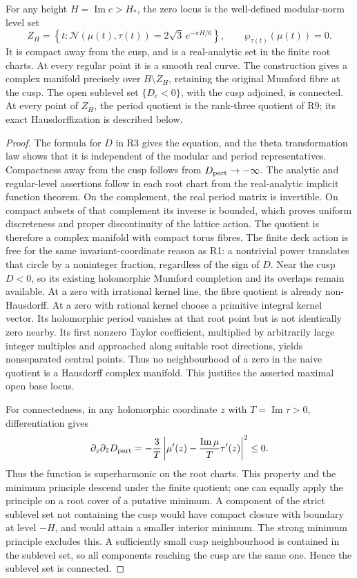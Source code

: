 \begin{proposition}[D.4.2; Proved]
For any height \(H=\operatorname{Im}c>H_*\), the zero locus is the
well-defined modular-norm level set
\[
 Z_H=\left\{t:\mathcal N(\mu(t),\tau(t))
                    =2\sqrt3\,e^{-\pi H/6}\right\},\qquad
 \wp_{\tau(t)}(\mu(t))=0.
\]
It is compact away from the cusp, and is a real-analytic set in the
finite root charts. At every regular point it is a smooth real curve.
The construction gives a complex manifold precisely over
\(B\setminus Z_H\), retaining the original Mumford fibre at the cusp.
The open sublevel set \(\{D_c<0\}\), with the cusp adjoined, is
connected. At every point of \(Z_H\), the period quotient is the
rank-three quotient of R9; its exact Hausdorffization is described
below.
\end{proposition}
\begin{proof}
The formula for \(D\) in R3 gives the equation, and the theta
transformation law shows that it is independent of the modular and
period representatives. Compactness away from the cusp follows from
\(D_{\rm part}\to-\infty\). The analytic and regular-level
assertions follow in each root chart from the real-analytic implicit
function theorem. On the complement, the real period matrix is
invertible. On compact subsets of that complement its inverse is
bounded, which proves uniform discreteness and proper discontinuity
of the lattice action. The quotient is therefore a complex manifold
with compact torus fibres. The finite deck action is free for the
same invariant-coordinate reason as R1: a nontrivial power translates
that circle by a noninteger fraction, regardless of the sign of
\(D\). Near the cusp \(D<0\), so its existing holomorphic Mumford
completion and its overlaps remain available.
At a zero with irrational kernel line, the fibre quotient is already
non-Hausdorff. At a zero with rational kernel choose a primitive
integral kernel vector. Its holomorphic period vanishes at that root
point but is not identically zero nearby. Its first nonzero Taylor
coefficient, multiplied by arbitrarily large integer multiples and
approached along suitable root directions, yields nonseparated
central points. Thus no neighbourhood of a zero in the naive quotient
is a Hausdorff complex manifold. This justifies the asserted maximal
open base locus.

For connectedness, in any holomorphic coordinate \(z\) with
\(T=\operatorname{Im}\tau>0\), differentiation gives
\[
 \partial_z\partial_{\bar z}D_{\rm part}
 =-\frac3T\left|\mu'(z)-
         \frac{\operatorname{Im}\mu}{T}\tau'(z)\right|^2\le0.
\]
Thus the function is superharmonic on the root charts. This property
and the minimum principle descend under the finite quotient; one
can equally apply the principle on a root cover of a putative
minimum. A component of the strict sublevel set not containing the
cusp would have compact closure with boundary at level \(-H\), and
would attain a smaller interior minimum. The strong minimum
principle excludes this. A sufficiently small cusp neighbourhood is
contained in the sublevel set, so all components reaching the cusp
are the same one. Hence the sublevel set is connected.
\end{proof}

